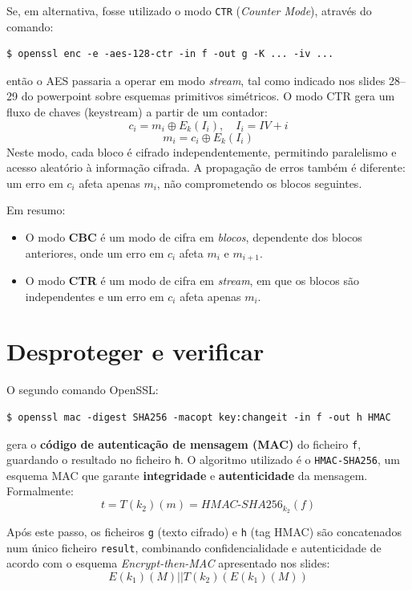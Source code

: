 Se, em alternativa, fosse utilizado o modo \texttt{CTR} (\textit{Counter Mode}), através do comando:
\begin{verbatim}
$ openssl enc -e -aes-128-ctr -in f -out g -K ... -iv ...
\end{verbatim}

então o AES passaria a operar em modo \textit{stream}, tal como indicado nos slides 28--29 do powerpoint sobre esquemas primitivos simétricos. 
O modo CTR gera um fluxo de chaves (keystream) a partir de um contador:
\[
c_i = m_i \oplus E_k(I_i), \quad I_i = IV + i
\]
\[
m_i = c_i \oplus E_k(I_i)
\]
Neste modo, cada bloco é cifrado independentemente, permitindo paralelismo e acesso aleatório à informação cifrada. 
A propagação de erros também é diferente: um erro em $c_i$ afeta apenas $m_i$, não comprometendo os blocos seguintes.

Em resumo:
\begin{itemize}
  \item O modo \textbf{CBC} é um modo de cifra em \textit{blocos}, dependente dos blocos anteriores, onde um erro em $c_i$ afeta $m_i$ e $m_{i+1}$.
  \item O modo \textbf{CTR} é um modo de cifra em \textit{stream}, em que os blocos são independentes e um erro em $c_i$ afeta apenas $m_i$.
\end{itemize}

\section{Desproteger e verificar}

O segundo comando OpenSSL:
\begin{verbatim}
$ openssl mac -digest SHA256 -macopt key:changeit -in f -out h HMAC
\end{verbatim}

gera o \textbf{código de autenticação de mensagem (MAC)} do ficheiro \texttt{f}, guardando o resultado no ficheiro \texttt{h}. 
O algoritmo utilizado é o \texttt{HMAC-SHA256}, um esquema MAC que garante \textbf{integridade} e \textbf{autenticidade} da mensagem. 
Formalmente:
\[
t = T(k_2)(m) = HMAC\text{-}SHA256_{k_2}(f)
\]

Após este passo, os ficheiros \texttt{g} (texto cifrado) e \texttt{h} (tag HMAC) são concatenados num único ficheiro \texttt{result}, combinando confidencialidade e autenticidade de acordo com o esquema \textit{Encrypt-then-MAC} apresentado nos slides:
\[
E(k_1)(M) || T(k_2)(E(k_1)(M))
\]

